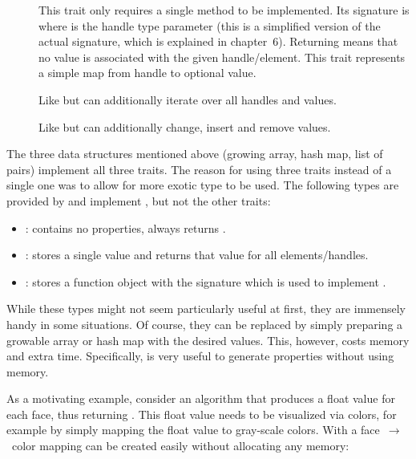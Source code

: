 \begin{description}
  \item [] This trait only requires a single method to be implemented.
  Its signature is  where  is the handle type parameter (this is a simplified version of the actual signature, which is explained in chapter~6).
  Returning  means that no value is associated with the given handle/element.
  This trait represents a simple map from handle to optional value.
  \item [] Like  but can additionally iterate over all handles and values.
  \item [] Like  but can additionally change, insert and remove values.
\end{description}

The three data structures mentioned above (growing array, hash map, list of pairs) implement all three traits.
The reason for using three traits instead of a single one was to allow for more exotic type to be used.
The following types are provided by  and implement , but not the other traits:

\begin{itemize}
\item {}: contains no properties, always returns .
\item {}: stores a single value and returns that value for all elements/handles.
\item {}: stores a function object with the signature  which is used to implement .
\end{itemize}

While these types might not seem particularly useful at first, they are immensely handy in some situations.
Of course, they can be replaced by simply preparing a growable array or hash map with the desired values.
This, however, costs memory and extra time.
Specifically,  is very useful to generate properties without using memory.

As a motivating example, consider an algorithm that produces a float value for each face, thus returning .
This float value needs to be visualized via colors, for example by simply mapping the float value to gray-scale colors.
With  a face~$\rightarrow$~color mapping can be created easily without allocating any memory:

